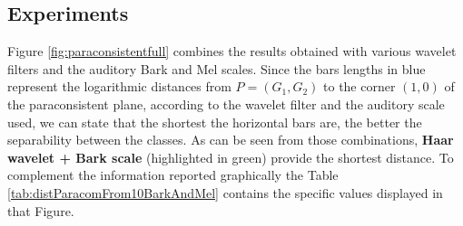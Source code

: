 	\subsection{Experiments}
		\par Figure \ref{fig:paraconsistentfull} combines the results obtained with various wavelet filters and the auditory Bark and Mel scales. Since the bars lengths in blue represent the logarithmic distances from $P=(G_1,G_2)$ to the corner $(1,0)$ of the paraconsistent plane, according to the wavelet filter and the auditory scale used, we can state that the shortest the horizontal bars are, the better the separability between the classes. As can be seen from those combinations, \textbf{Haar wavelet + Bark scale} (highlighted in green) provide the shortest distance. To complement the information reported graphically the Table \ref{tab:distParacomFrom10BarkAndMel} contains the specific values displayed in that Figure.
		\\
